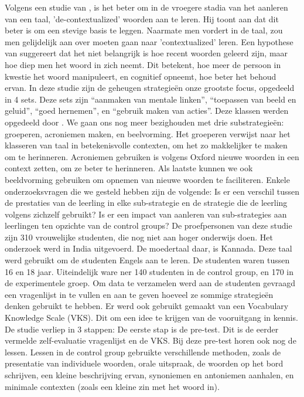 \documentclass{hogent-article}
\begin{document}
	Volgens een studie van \autocite{Nielson2006}, is het beter om in de vroegere stadia van het aanleren van een taal, 'de-contextualized' woorden aan te leren. Hij toont aan dat dit beter is om een stevige basis te leggen. Naarmate men vordert in de taal, zou men gelijdelijk aan over moeten gaan naar 'contextualized' leren. Een hypothese van \autocite{CraikTulving1975} suggereert dat het niet belangrijk is hoe recent woorden geleerd zijn, maar hoe diep men het woord in zich neemt. Dit betekent, hoe meer de persoon in kwestie het woord manipuleert, en cognitief opneemt, hoe beter het behoud ervan. In deze studie zijn de geheugen strategieën onze grootste focus, opgedeeld in 4 sets. Deze sets zijn ``aanmaken van mentale linken'', ``toepassen van beeld en geluid'', ``goed hernemen'', en ``gebruik maken van acties''. Deze klassen werden opgedeeld door \autocite{Oxford1990}. We gaan ons nog meer bezighouden met drie substrategieën: groeperen, acroniemen maken, en beelvorming. Het groeperen verwijst naar het klasseren van taal in betekenisvolle contexten, om het zo makkelijker te maken om te herinneren. Acroniemen gebruiken is volgens Oxford nieuwe woorden in een context zetten, om ze beter te herinneren. Als laatste kunnen we ook beeldvorming gebruiken om opnemen van nieuwe woorden te faciliteren.
	Enkele onderzoeksvragen die we gesteld hebben zijn de volgende:
	Is er een verschil tussen de prestaties van de leerling in elke sub-strategie en de strategie die de leerling volgens zichzelf gebruikt?
	Is er een impact van aanleren van sub-strategies aan leerlingen ten opzichte van de control groups?
	De proefpersonen van deze studie zijn 310 vrouwelijke studenten, die nog niet aan hoger onderwijs doen. Het onderzoek werd in India uitgevoerd. De moedertaal daar, is Kannada. Deze taal werd gebruikt om de studenten Engels aan te leren. De studenten waren tussen 16 en 18 jaar. Uiteindelijk ware ner 140 studenten in de control group, en 170 in de experimentele groep.
	Om data te verzamelen werd aan de studenten gevraagd een vragenlijst in te vullen en aan te geven hoeveel ze sommige strategieën denken gebruikt te hebben.
	Er werd ook gebruikt gemaakt van een Vocabulary Knowledge Scale (VKS). Dit om een idee te krijgen van de vooruitgang in kennis.
	De studie verliep in 3 stappen: De eerste stap is de pre-test. 
	Dit is de eerder vermelde zelf-evaluatie vragenlijst en de VKS. 
	Bij deze pre-test horen ook nog de lessen.
	Lessen in de control group gebruikte verschillende methoden, zoals de presentatie van individuele woorden, orale uitspraak, de woorden op het bord schrijven, een kleine beschrijving ervan, synoniemen en antoniemen aanhalen, en minimale contexten (zoals een kleine zin met het woord in).
\end{document}
